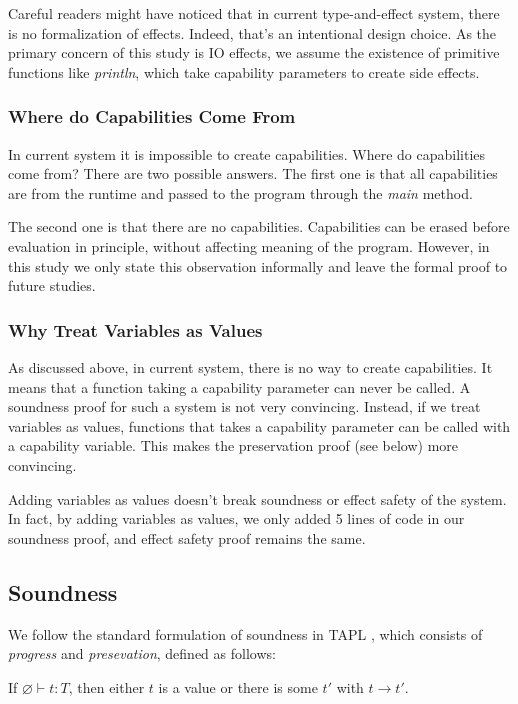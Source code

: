 Careful readers might have noticed that in current type-and-effect system,
there is no formalization of effects. Indeed, that's an intentional
design choice. As the primary concern of this study is IO effects, we
assume the existence of primitive functions like \emph{println}, which
take capability parameters to create side effects.

\subsubsection{Where do Capabilities Come From}

In current system it is impossible to create capabilities. Where do
capabilities come from?  There are two possible answers. The first one
is that all capabilities are from the runtime and passed to the
program through the \emph{main} method.

The second one is that there are no capabilities. Capabilities can be
erased before evaluation in principle, without affecting meaning of
the program. However, in this study we only state this observation
informally and leave the formal proof to future studies.

\subsubsection{Why Treat Variables as Values}

As discussed above, in current system, there is no way to create
capabilities. It means that a function taking a capability parameter
can never be called. A soundness proof for such a system is not very
convincing. Instead, if we treat variables as values, functions that
takes a capability parameter can be called with a capability
variable. This makes the preservation proof (see below) more
convincing.

Adding variables as values doesn't break soundness or effect safety of
the system. In fact, by adding variables as values, we only added 5
lines of code in our soundness proof, and effect safety proof remains
the same.

\subsection{Soundness}

We follow the standard formulation of soundness in TAPL
\cite{pierce2002types}, which consists of \emph{progress} and
\emph{presevation}, defined as follows:

\begin{theorem}[Progress]
If $\varnothing \vdash t : T$, then either $t$ is a value or there is some
$t'$ with $t \longrightarrow t'$.
\end{theorem}

